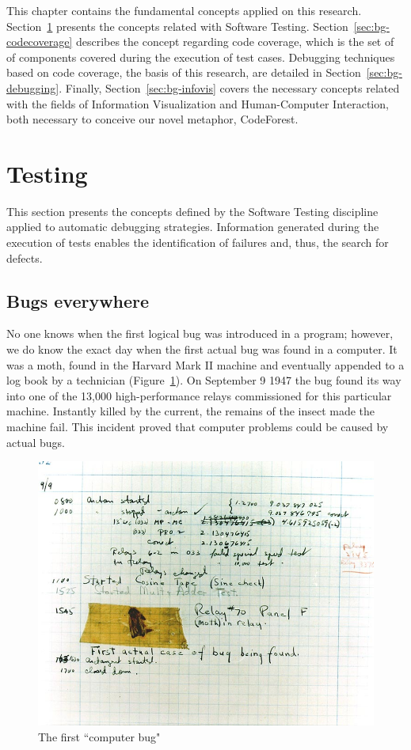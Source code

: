 This chapter contains the fundamental concepts applied on this research.
Section~\ref{sec:bg-testing} presents the concepts related with Software
Testing. Section~\ref{sec:bg-codecoverage} describes the concept regarding code
coverage, which is the set of of components covered during the execution of test
cases. Debugging techniques based on code coverage, the basis of this research,
are detailed in Section~\ref{sec:bg-debugging}.
Finally, Section~\ref{sec:bg-infovis} covers the necessary concepts related with
the fields of Information Visualization and Human-Computer Interaction, both
necessary to conceive our novel metaphor, CodeForest.

\section{Testing}\label{sec:bg-testing}

This section presents the concepts defined by the Software Testing discipline
applied to automatic debugging strategies. Information generated during the
execution of tests enables the identification of failures and, thus, the search
for defects.

\subsection{Bugs everywhere}

No one knows when the first logical bug was introduced in a program; however, we
do know the exact day when the first actual bug was found in a computer. It was
a moth, found in the Harvard Mark II machine and eventually appended to a log
book by a technician (Figure~\ref{fig:firstbug}).
On September 9 1947 the bug found its way into one of the 13,000
high-performance relays commissioned for this particular machine. Instantly
killed by the current, the remains of the insect made the machine fail. This
incident proved that computer problems could be caused by actual bugs.

\begin{figure}[h!]
\centering
\includegraphics[width=1\textwidth]{figures/firstbug}
\caption{The first ``computer bug"\cite{naval1947bug}}
\label{fig:firstbug}
\end{figure}


